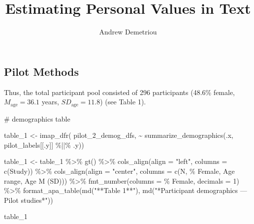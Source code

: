 \documentclass[
  man]{apa7}
\title{Estimating Personal Values in Text}
\author{Andrew Demetriou}
\date{}
\newenvironment{Shaded}{\begin{snugshade}}{\end{snugshade}}
\newcommand{\AttributeTok}[1]{\textcolor[rgb]{0.40,0.45,0.13}{#1}}
\newcommand{\CommentTok}[1]{\textcolor[rgb]{0.37,0.37,0.37}{#1}}
\newcommand{\DecValTok}[1]{\textcolor[rgb]{0.68,0.00,0.00}{#1}}
\newcommand{\FunctionTok}[1]{\textcolor[rgb]{0.28,0.35,0.67}{#1}}
\newcommand{\NormalTok}[1]{\textcolor[rgb]{0.00,0.23,0.31}{#1}}
\newcommand{\OtherTok}[1]{\textcolor[rgb]{0.00,0.23,0.31}{#1}}
\newcommand{\SpecialCharTok}[1]{\textcolor[rgb]{0.37,0.37,0.37}{#1}}
\newcommand{\StringTok}[1]{\textcolor[rgb]{0.13,0.47,0.30}{#1}}
\begin{document}
\maketitle


\subsection{Pilot Methods}\label{pilot-methods}

Thus, the total participant pool consisted of 296 participants (48.6\%
female, \(M_{\text{age}} = 36.1\) years, \(SD_{\text{age}} = 11.8\))
(see Table 1).

\begin{Shaded}
\begin{Highlighting}[]
\CommentTok{\# demographics table}

\NormalTok{table\_1 }\OtherTok{\textless{}{-}} \FunctionTok{imap\_dfr}\NormalTok{(}
\NormalTok{  pilot\_2\_demog\_dfs,}
  \SpecialCharTok{\textasciitilde{}} \FunctionTok{summarize\_demographics}\NormalTok{(.x, pilot\_labels[[.y]] }\SpecialCharTok{\%||\%}\NormalTok{ .y))}

\NormalTok{table\_1 }\OtherTok{\textless{}{-}}\NormalTok{ table\_1 }\SpecialCharTok{\%\textgreater{}\%}
  \FunctionTok{gt}\NormalTok{() }\SpecialCharTok{\%\textgreater{}\%}
  \FunctionTok{cols\_align}\NormalTok{(}\AttributeTok{align =} \StringTok{"left"}\NormalTok{,  }\AttributeTok{columns =} \FunctionTok{c}\NormalTok{(Study)) }\SpecialCharTok{\%\textgreater{}\%}
  \FunctionTok{cols\_align}\NormalTok{(}\AttributeTok{align =} \StringTok{"center"}\NormalTok{, }\AttributeTok{columns =} \FunctionTok{c}\NormalTok{(N, }\StringTok{\textasciigrave{}}\AttributeTok{\% Female}\StringTok{\textasciigrave{}}\NormalTok{, }\StringTok{\textasciigrave{}}\AttributeTok{Age range}\StringTok{\textasciigrave{}}\NormalTok{, }\StringTok{\textasciigrave{}}\AttributeTok{Age M (SD)}\StringTok{\textasciigrave{}}\NormalTok{)) }\SpecialCharTok{\%\textgreater{}\%}
  \FunctionTok{fmt\_number}\NormalTok{(}\AttributeTok{columns =} \StringTok{\textasciigrave{}}\AttributeTok{\% Female}\StringTok{\textasciigrave{}}\NormalTok{, }\AttributeTok{decimals =} \DecValTok{1}\NormalTok{) }\SpecialCharTok{\%\textgreater{}\%}
  \FunctionTok{format\_apa\_table}\NormalTok{(}\FunctionTok{md}\NormalTok{(}\StringTok{"**Table 1**"}\NormalTok{), }\FunctionTok{md}\NormalTok{(}\StringTok{"*Participant demographics — Pilot studies*"}\NormalTok{))}

\NormalTok{table\_1}
\end{Highlighting}
\end{Shaded}
\end{document}
